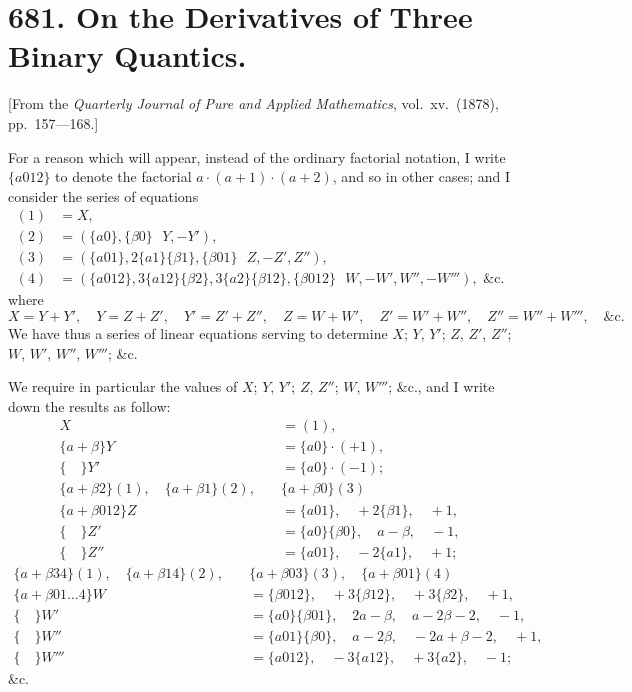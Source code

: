 \documentclass[12pt,a4paper]{article}
\theoremstyle{cayley}
\theoremstyle{definition}
\numberwithin{equation}{section}
\begin{document}
\newpage

\section*{681. On the Derivatives of Three Binary Quantics.}

[From the \textit{Quarterly Journal of Pure and Applied Mathematics}, vol.\ xv.\ (1878), pp.\ 157---168.]

For a reason which will appear, instead of the ordinary factorial notation, I write $\{a012\}$ to denote the factorial $a \cdot (a+1) \cdot (a+2)$, and so in other cases; and I consider the series of equations
\begin{align*}
(1) &= X, \\
(2) &= (\{a0\}, \{\beta0\} \,\,\,\, Y, -Y'), \\
(3) &= (\{a01\}, 2\{a1\}\{\beta1\}, \{\beta01\} \,\,\,\, Z, -Z', Z''), \\
(4) &= (\{a012\}, 3\{a12\}\{\beta2\}, 3\{a2\}\{\beta12\}, \{\beta012\} \,\,\,\, W, -W', W'', -W'''), \text{ \&c.}
\end{align*}
where
\[
X = Y + Y', \quad Y = Z + Z', \quad Y' = Z' + Z'', \quad Z = W + W', \quad Z' = W' + W'', \quad Z'' = W'' + W''', \quad \text{\&c.}
\]
We have thus a series of linear equations serving to determine $X$; $Y$, $Y'$; $Z$, $Z'$, $Z''$; $W$, $W'$, $W''$, $W'''$; \&c.

We require in particular the values of $X$; $Y$, $Y'$; $Z$, $Z''$; $W$, $W'''$; \&c., and I write down the results as follow:
\begin{align*}
X &= (1), \\
\{a + \beta\}Y &= \{a0\} \cdot (+1), \\
\{ \quad \}Y' &= \{a0\} \cdot (-1); \\
\{a + \beta 2\}(1), \quad \{a + \beta 1\}(2), \quad &\{a + \beta 0\}(3) \\
\{a + \beta 012\}Z &= \{a01\}, \quad +2\{\beta 1\}, \quad +1, \\
\{ \quad \}Z' &= \{a0\}\{\beta0\}, \quad a - \beta, \quad -1, \\
\{ \quad \}Z'' &= \{a01\}, \quad -2\{a1\}, \quad +1;
\end{align*}
\begin{align*}
\{a + \beta 34\}(1), \quad \{a + \beta 14\}(2), \quad &\{a + \beta 03\}(3), \quad \{a + \beta 01\}(4) \\
\{a + \beta 01 \ldots 4\}W &= \{\beta 012\}, \quad +3\{\beta 12\}, \quad +3\{\beta 2\}, \quad +1, \\
\{ \quad \}W' &= \{a0\}\{\beta 01\}, \quad 2a - \beta, \quad a - 2\beta - 2, \quad -1, \\
\{ \quad \}W'' &= \{a01\}\{\beta 0\}, \quad a - 2\beta, \quad -2a + \beta - 2, \quad +1, \\
\{ \quad \}W''' &= \{a012\}, \quad -3\{a12\}, \quad +3\{a2\}, \quad -1;
\end{align*}
\&c.
\end{document}

